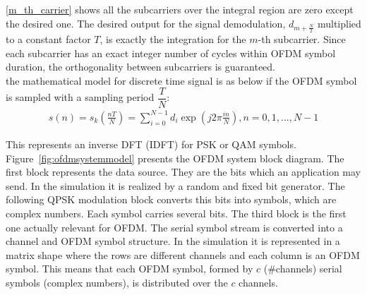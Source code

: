 \ref{m_th_carrier} shows all the subcarriers over the integral region are zero except the desired one. The desired output for the signal demodulation, $d_{m+ \frac{N}{2}}$ multiplied to a constant factor $T$, is exactly the integration for the $m$-th subcarrier. Since each subcarrier has an exact integer number of cycles within OFDM symbol duration, the orthogonality between subcarriers is guaranteed.\\
the mathematical model for discrete time signal is as below if the OFDM symbol is sampled with a sampling period $\dfrac{T}{N}$:
\begin{equation} \label{math_model}
\begin{split}
s(n)= s_{k}(\frac{nT}{N})= \sum\limits_{i=0}^{N-1} d_{i} \exp(j2\pi\frac{in}{N}), n= 0, 1, ... , N-1
\end{split}
\end{equation}

This represents an inverse DFT (IDFT) for PSK or QAM symbols.\\

Figure~\ref{fig:ofdmsystemmodel} presents the OFDM system block diagram. The first block represents the data source. They are the bits which an application may send. In the simulation it is realized by a random and fixed bit generator. The following QPSK modulation block converts this bits into symbols, which are complex numbers. Each symbol carries several bits. The third block is the first one actually relevant for OFDM. The serial symbol stream is converted into a channel and OFDM symbol structure. In the simulation it is represented in a matrix shape where the rows are different channels and each column is an OFDM symbol. This means that each OFDM symbol, formed by $c$ (\#channels) serial symbols (complex numbers), is distributed over the $c$ channels.\\

